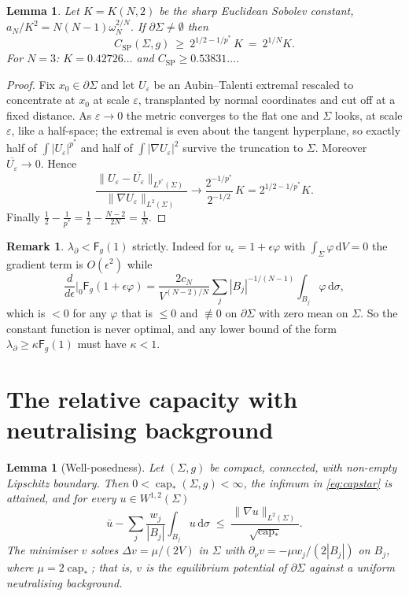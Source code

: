 \documentclass[11pt,reqno]{amsart}
\theoremstyle{plain}
\newtheorem{lemma}[theorem]{Lemma}
\theoremstyle{definition}
\newtheorem{remark}[theorem]{Remark}
\newcommand{\aN}{a_N}
\newcommand{\cN}{c_N}
\newcommand{\pstar}{p^{*}}
\newcommand{\cpstar}{\operatorname{cap}_{*}}
\newcommand{\Fq}{\mathsf{F}}
\newcommand{\Ksob}{K}
\newcommand{\Csp}{C_{\mathrm{SP}}}
\newcommand{\dd}{\,\mathrm{d}}
\begin{document}
\begin{lemma}
\label{lem:csp-lower}
Let $\Ksob=\Ksob(N,2)$ be the sharp Euclidean Sobolev constant,
$\aN/\Ksob^2=N(N-1)\omega_N^{2/N}$. If $\partial\Sigma\ne\emptyset$ then
\[
   \Csp(\Sigma,g)\ \ge\ 2^{1/2-1/\pstar}\,\Ksob\ =\ 2^{1/N}\Ksob .
\]
For $N=3$: $\Ksob=0.42726\ldots$ and $\Csp\ge0.53831\ldots$.
\end{lemma}

\begin{proof}
Fix $x_0\in\partial\Sigma$ and let $U_\varepsilon$ be an Aubin--Talenti extremal
rescaled to concentrate at $x_0$ at scale $\varepsilon$, transplanted by normal
coordinates and cut off at a fixed distance. As $\varepsilon\to0$ the metric
converges to the flat one and $\Sigma$ looks, at scale $\varepsilon$, like a
half-space; the extremal is even about the tangent hyperplane, so exactly half of
$\int|U_\varepsilon|^{\pstar}$ and half of $\int|\nabla U_\varepsilon|^2$ survive
the truncation to $\Sigma$. Moreover $\overline{U_\varepsilon}\to0$. Hence
\[
  \frac{\|U_\varepsilon-\overline{U_\varepsilon}\|_{L^{\pstar}(\Sigma)}}
       {\|\nabla U_\varepsilon\|_{L^2(\Sigma)}}
  \longrightarrow
  \frac{2^{-1/\pstar}}{2^{-1/2}}\,\Ksob=2^{1/2-1/\pstar}\Ksob .
\]
Finally $\tfrac12-\tfrac1{\pstar}=\tfrac12-\tfrac{N-2}{2N}=\tfrac1N$.
\end{proof}

\begin{remark}
\label{rem:notF1}
$\lambda_\partial<\Fq_g(1)$ strictly. Indeed for $u_\epsilon=1+\epsilon\varphi$
with $\int_\Sigma\varphi\dd V=0$ the gradient term is $O(\epsilon^2)$ while
\[
  \frac{d}{d\epsilon}\Big|_{0}\Fq_g(1+\epsilon\varphi)
  =\frac{2\cN}{V^{(N-2)/N}}\sum_j|B_j|^{-1/(N-1)}\int_{B_j}\varphi\dd\sigma,
\]
which is $<0$ for any $\varphi$ that is $\le0$ and $\not\equiv0$ on
$\partial\Sigma$ with zero mean on $\Sigma$. So the constant function is never
optimal, and any lower bound of the form $\lambda_\partial\ge\kappa\Fq_g(1)$ must
have $\kappa<1$.
\end{remark}

\section{The relative capacity with neutralising background}
\label{sec:cap}

\begin{lemma}[Well-posedness]
\label{lem:capstar}
Let $(\Sigma,g)$ be compact, \emph{connected}, with non-empty Lipschitz boundary.
Then $0<\cpstar(\Sigma,g)<\infty$, the infimum in \eqref{eq:capstar} is attained,
and for every $u\in W^{1,2}(\Sigma)$
\begin{equation}
\label{eq:capineq}
  \bar u-\sum_{j}\frac{w_j}{|B_j|}\int_{B_j}u\dd\sigma
  \;\le\;\frac{\|\nabla u\|_{L^2(\Sigma)}}{\sqrt{\cpstar}} .
\end{equation}
The minimiser $v$ solves $\Delta v=\mu/(2V)$ in $\Sigma$ with
$\partial_\nu v=-\mu w_j/(2|B_j|)$ on $B_j$, where $\mu=2\cpstar$; that is, $v$ is
the equilibrium potential of $\partial\Sigma$ against a uniform neutralising
background.
\end{lemma}
\end{document}
